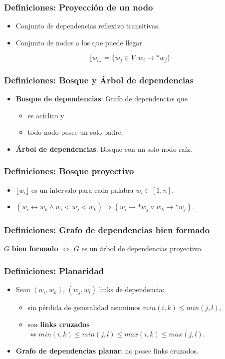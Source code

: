 \documentclass[spanish]{beamer}
\begin{document}
\begin{frame}
\frametitle{Definiciones: Proyección de un nodo}
\begin{itemize}
    \item Conjunto de dependencias reflexivo transitivas.
    \item Conjunto de nodos a los que puede llegar.
\end{itemize}
\[\lfloor w_i\rfloor = \{w_j\in V : w_i \rightarrow * w_j\}\]
\end{frame}

\begin{frame}
\frametitle{Definiciones: Bosque y Árbol de dependencias}
\begin{itemize}
\item \textbf{Bosque de dependencias}: Grafo de dependencias que
\begin{itemize}
    \item es acíclico y
    \item todo nodo posee un solo padre.
\end{itemize}
\item \textbf{Árbol de dependencias}: Bosque con un solo nodo raíz.
\end{itemize}
\end{frame}

\begin{frame}
\frametitle{Definiciones: Bosque proyectivo}
\begin{itemize}
    \item $\lfloor w_i\rfloor$ es un intervalo para cada palabra $w_i\in [1,n]$.
    \item $(w_i \leftrightarrow w_k \wedge w_i < w_j < w_k) \Rightarrow (w_i \rightarrow * w_j \vee w_k \rightarrow * w_j)$.
\end{itemize}
\end{frame}

\begin{frame}
\frametitle{Definiciones: Grafo de dependencias bien formado}
$G$ \textbf{bien formado} $\Leftrightarrow$ $G$ es un árbol de dependencias proyectivo.
\end{frame}

\begin{frame}
\frametitle{Definiciones: Planaridad}
\begin{itemize}
    \item Sean $(w_i,w_k)$, $(w_j,w_l)$ links de dependencia:
    \begin{itemize}
        \item sin pérdida de generalidad asumimos $min(i,k) \leq min(j,l)$,
        \item son \textbf{links cruzados} $\Leftrightarrow min(i,k)\leq min(j,l)\leq max(i,k)\leq max(j,l)$.
    \end{itemize} 
    \item \textbf{Grafo de dependencias planar}: no posee links cruzados.
\end{itemize}
\end{frame}
\end{document}
